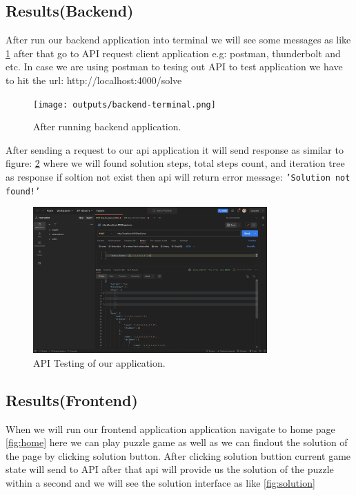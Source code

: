 \documentclass[12pt]{report}
\begin{document}
\subsection{Results(Backend)}
After run our backend application into terminal we will see some messages as like \ref{fig:terminal} after that go to API request client application e.g: postman, thunderbolt and etc. In case we are using postman to tesing out API to test application we have to hit the url: http://localhost:4000/solve
\newline \begin{figure}[thbp]
    \begin{center}
     \texttt{[image: outputs/backend-terminal.png]}
    \end{center}
    \caption{After running backend application.}
    \label{fig:terminal}
 \end{figure}\newline
After sending a request to our api application it will send response as similar to figure: \ref{fig:api-testing} where we will found solution steps, total steps count, and iteration tree as response if soltion not exist then api will return error message: \texttt{'Solution not found!'}
 \begin{figure}[thbp]
    \begin{center}
     \includegraphics[width=0.8\textwidth]{outputs/api-testing.png}
    \end{center}
    \caption{API Testing of our application.}
    \label{fig:api-testing}
 \end{figure}

\subsection{Results(Frontend)}
When we will run our frontend application application navigate to home page \ref{fig:home} here we can play puzzle game as well as we can findout the solution of the page by clicking solution button.
After clicking solution buttion current game state will send to API after that api will provide us the solution of the puzzle within a second and we will see the solution interface as like \ref{fig:solution}
\end{document}
